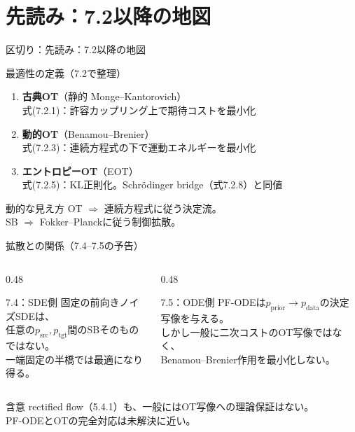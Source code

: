 \section{先読み：7.2以降の地図}
\asmain
\begin{frame}{区切り：先読み：7.2以降の地図}
    \tableofcontents[currentsection]
\end{frame}
\asmain
\begin{frame}{最適性の定義（7.2で整理）}
    \begin{enumerate}
        \item \textbf{古典OT}（静的 Monge--Kantorovich）\\
        式(7.2.1)：許容カップリング上で期待コストを最小化
        \item \textbf{動的OT}（Benamou--Brenier）\\
        式(7.2.3)：連続方程式の下で運動エネルギーを最小化
        \item \textbf{エントロピーOT}（EOT）\\
        式(7.2.5)：KL正則化。Schrödinger bridge（式7.2.8）と同値
    \end{enumerate}
    \begin{exampleblock}{動的な見え方}
        OT $\Rightarrow$ 連続方程式に従う決定流。\\
        SB $\Rightarrow$ Fokker--Planckに従う制御拡散。
    \end{exampleblock}
\end{frame}
\asmain
\begin{frame}{拡散との関係（7.4--7.5の予告）}
    \begin{columns}[T,onlytextwidth]
        \begin{column}{0.48\textwidth}
            \begin{block}{7.4：SDE側}
                固定の前向きノイズSDEは、\\
                任意の$p_{\mathrm{src}},p_{\mathrm{tgt}}$間のSBそのものではない。\\
                一端固定の半橋では最適になり得る。
            \end{block}
        \end{column}
        \begin{column}{0.48\textwidth}
            \begin{block}{7.5：ODE側}
                PF-ODEは$p_{\mathrm{prior}}\to p_{\mathrm{data}}$の決定写像を与える。\\
                しかし一般に二次コストのOT写像ではなく、\\
                Benamou--Brenier作用を最小化しない。
            \end{block}
        \end{column}
    \end{columns}
    \vspace{0.4em}
    \begin{exampleblock}{含意}
        rectified flow（5.4.1）も、一般にはOT写像への理論保証はない。\\
        PF-ODEとOTの完全対応は未解決に近い。
    \end{exampleblock}
\end{frame}
